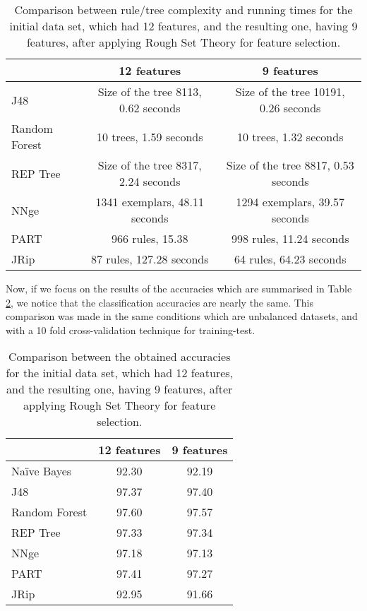 \documentclass{llncs}
\begin{document}
 
\begin{table}[htpb]
\centering
 \caption{\label{tab_runningtimes} Comparison between rule/tree complexity and running times for the initial data set, which had 12 features, and the resulting one, having 9 features, after applying Rough Set Theory for feature selection.} 
{\small
\begin{tabular}{|l|c|c|}
\cline{2-3}
\multicolumn{1}{l|}{} & 12 features & 9 features \\
\hline
J48 & Size of the tree 8113, 0.62 seconds & Size of the tree 10191, 0.26 seconds \\
\cline{1-1}
Random Forest & 10 trees, 1.59 seconds & 10 trees, 1.32 seconds \\
\cline{1-1}
REP Tree & Size of the tree 8317, 2.24 seconds & Size of the tree 8817, 0.53 seconds \\
\cline{1-1}
NNge & 1341 exemplars, 48.11 seconds & 1294 exemplars, 39.57 seconds \\
\cline{1-1}
PART & 966 rules, 15.38 & 998 rules, 11.24 seconds \\
\cline{1-1}
JRip & 87 rules, 127.28 seconds & 64 rules, 64.23 seconds \\
\hline
\end{tabular}
}
\end{table}

Now, if we focus on the results of the accuracies which are summarised in Table \ref{tab_12featvs9feat}, we notice that the classification accuracies are nearly the same. This comparison was made in the same conditions which are unbalanced datasets, and with a 10 fold cross-validation technique for training-test.

\begin{table}[htpb]
\centering
 \caption{\label{tab_12featvs9feat} Comparison between the obtained accuracies for the initial data set, which had 12 features, and the resulting one, having 9 features, after applying Rough Set Theory for feature selection.}
{\small
\begin{tabular}{|l|c|c|}
\cline{2-3}
\multicolumn{1}{l|}{} & 12 features & 9 features \\
\hline
Na\"ive Bayes & 92.30 & 92.19 \\
\cline{1-1}
J48 & 97.37 & 97.40 \\
\cline{1-1}
Random Forest & 97.60 & 97.57 \\
\cline{1-1}
REP Tree & 97.33 & 97.34 \\
\cline{1-1}
NNge & 97.18 & 97.13 \\
\cline{1-1}
PART & 97.41 & 97.27 \\
\cline{1-1}
JRip & 92.95 & 91.66 \\
\hline
\end{tabular}
}
\end{table}
\end{document}
